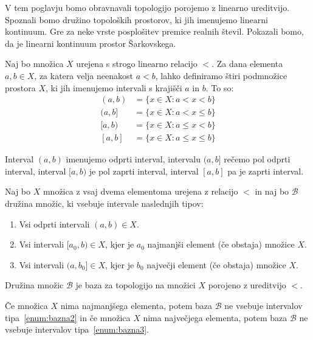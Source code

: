 \documentclass[../TG_magistrsko_delo_sections.tex]{subfiles}
\begin{document}
V tem poglavju bomo obravnavali topologijo porojemo z linearno ureditvijo. Spoznali bomo družino topoloških prostorov, ki jih imenujemo linearni kontinuum. Gre za neke vrste posplošitev premice realnih števil. Pokazali bomo, da je linearni kontinuum prostor Šarkovskega.

Naj bo množica $X$ urejena s strogo linearno relacijo $<$. Za dana elementa $a, b \in X$, za katera velja neenakost $a<b$, lahko definiramo štiri podmnožice prostora $X$, ki jih imenujemo intervali s krajišči $a$ in $b$. To so:
\begin{equation*} %
\begin{split}
(a, b) &= \{x \in X: a< x <b\} \\ 
(a, b] &= \{x \in X: a< x \leq b\} \\ 
[a, b) &= \{x \in X: a \leq x< b\} \\ 
[a, b] &= \{x \in X: a \leq x \leq b\}
\end{split}
\end{equation*}

\begin{opomba}\label{op:intervali}
Interval $(a, b)$ imenujemo odprti interval, intervalu $(a, b]$ rečemo pol odprti interval, interval $[a, b)$ je pol zaprti interval, interval $[a, b]$ pa je zaprti interval.
\end{opomba}

\begin{definicija}
Naj bo $X$ množica z vsaj dvema elementoma urejena z relacijo $<$ in naj bo $\mathcal{B}$ družina množic, ki vsebuje intervale naslednjih tipov:
\begin{enumerate}
\item Vsi odprti intervali $(a, b) \in X$. \label{enum:bazna1}
\item Vsi intervali $[a_0, b) \in X$, kjer je $a_0$ najmanjši element (če obstaja) množice $X$. \label{enum:bazna2}
\item Vsi intervali $(a, b_0] \in X$, kjer je $b_0$ največji element (če obstaja) množice $X$. \label{enum:bazna3}
\end{enumerate}
Družina množic $\mathcal{B}$ je baza za topologijo na množici $X$ porojeno z ureditvijo $<$.
\end{definicija}

\begin{opomba}\label{op:ekstremi}
Če množica $X$ nima najmanjšega elementa, potem baza $\mathcal{B}$ ne vsebuje intervalov tipa~\ref{enum:bazna2} in če množica $X$ nima največjega elementa, potem baza $\mathcal{B}$ ne vsebuje intervalov tipa~\ref{enum:bazna3}.
\end{opomba}
\end{document}
